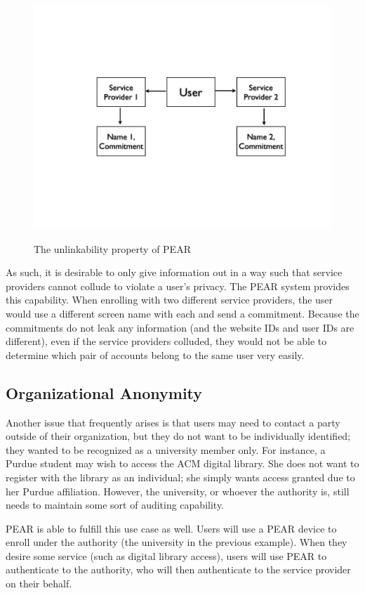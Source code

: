 \begin{figure}[!ht]
\includegraphics[width=500px]{images/pearpics.jpg}
\label{fig:pearunlinkability}
\caption{The unlinkability property of PEAR}
\end{figure}
\FloatBarrier

As such, it is desirable to only give information out in a way such that service providers cannot collude to violate
a user's privacy. The PEAR system provides this capability. When enrolling with two different service providers,
the user would use a different screen name with each and send a commitment. Because the commitments do not
leak any information (and the website IDs and user IDs are different), even if the service providers colluded, they would
not be able to determine which pair of accounts belong to the same user very easily.

\subsection{Organizational Anonymity}
Another issue that frequently arises is that users may need to contact a party outside of their organization, but
they do not want to be individually identified; they wanted to be recognized as a university member only. For instance,
a Purdue student may wish to access the ACM digital library. She does not want to register with the library as an
individual; she simply wants access granted due to her Purdue affiliation.
However, the university, or whoever the authority is, still needs to maintain some sort of auditing capability.

PEAR is able to fulfill this use case as well. Users will use a PEAR device to enroll under the authority (the university
in the previous example). When they desire some service (such as digital library access), users will use PEAR to 
authenticate to the authority, who will then authenticate to the service provider on their behalf.

